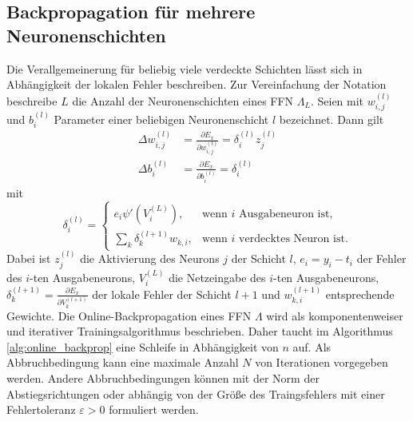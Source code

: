 \subsection*{Backpropagation für mehrere Neuronenschichten}
Die Verallgemeinerung für beliebig viele verdeckte Schichten lässt sich in Abhängigkeit der lokalen Fehler beschreiben. Zur Vereinfachung der Notation beschreibe $L$ die Anzahl der Neuronenschichten eines FFN $\Lambda_L$. Seien mit $w^{(l)}_{i,j}$ und $b^{(l)}_i$ Parameter einer beliebigen Neuronenschicht $l$ bezeichnet. Dann gilt 
\begin{align*}
    \Delta w^{(l)}_{i,j}&= \frac{\partial E_x}{\partial w^{(l)}_{i,j}}= \delta^{(l)}_i z^{(l)}_j \\
    \Delta b^{(l)}_{i}&= \frac{\partial E_x}{\partial b^{(l)}_{i}}= \delta^{(l)}_i
\end{align*}
mit 
\begin{equation*}
    \delta^{(l)}_i=
    \begin{cases}
        e_i \psi'(V^{(L)}_i), &\text{wenn $i$ Ausgabeneuron ist}, \\
        \sum_{k} \delta^{(l+1)}_k w_{k,i}, &\text{wenn $i$ verdecktes Neuron ist}.
    \end{cases}
\end{equation*}
Dabei ist $z^{(l)}_j$ die Aktivierung des Neurons $j$ der Schicht $l$, $e_i=y_i-t_i$ der Fehler des $i$-ten Ausgabeneurons, $V^{(L)}_i$ die Netzeingabe des $i$-ten Ausgabeneurons, $\delta^{(l+1)}_k= \frac{\partial E_x}{\partial V^{(l+1)}_k}$ der lokale Fehler der Schicht $l+1$ und $w^{(l+1)}_{k,i}$ entsprechende Gewichte. 
Die Online-Backpropagation eines FFN $\Lambda$ wird als komponentenweiser und iterativer Trainingsalgorithmus beschrieben. Daher taucht im Algorithmus \ref{alg:online_backprop} eine Schleife in Abhängigkeit von $n$ auf. Als Abbruchbedingung kann eine maximale Anzahl $N$ von Iterationen vorgegeben werden. Andere Abbruchbedingungen können mit der Norm der Abstiegsrichtungen oder abhängig von der Größe des Traingsfehlers mit einer Fehlertoleranz $\varepsilon >0$ formuliert werden.

